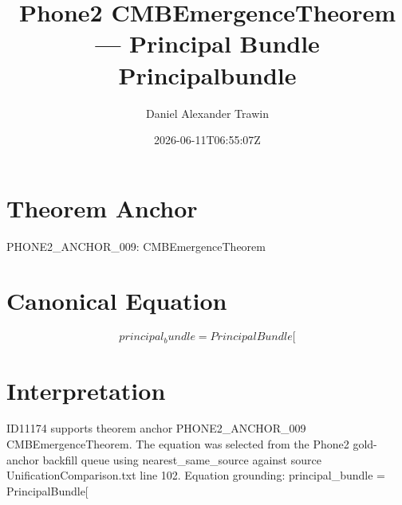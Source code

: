 \documentclass[11pt]{article}
\title{Phone2 CMBEmergenceTheorem — Principal Bundle Principalbundle}
\author{Daniel Alexander Trawin}
\date{2026-06-11T06:55:07Z}
\begin{document}
\maketitle
\section*{Theorem Anchor}
PHONE2_ANCHOR_009: CMBEmergenceTheorem
\section*{Canonical Equation}
\[
principal_bundle = PrincipalBundle[
\]
\section*{Interpretation}
ID11174 supports theorem anchor PHONE2_ANCHOR_009 CMBEmergenceTheorem. The equation was selected from the Phone2 gold-anchor backfill queue using nearest_same_source against source UnificationComparison.txt line 102. Equation grounding: principal_bundle = PrincipalBundle[
\end{document}
